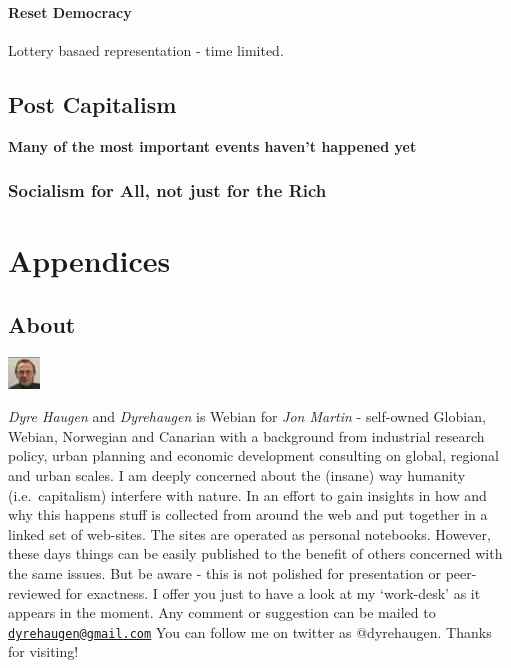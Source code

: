 \documentclass[
]{book}
\begin{document}
\hypertarget{reset-democracy}{%
\subsection{Reset Democracy}\label{reset-democracy}}

Lottery basaed representation - time limited.

\hypertarget{post-capitalism}{%
\chapter{Post Capitalism}\label{post-capitalism}}

\textbf{Many of the most important events haven't happened yet}

\hypertarget{socialism-for-all-not-just-for-the-rich}{%
\section{Socialism for All, not just for the Rich}\label{socialism-for-all-not-just-for-the-rich}}

\hypertarget{part-appendices}{%
\part{Appendices}\label{part-appendices}}

\hypertarget{appendix-appendices}{%
\appendix}


\hypertarget{about}{%
\chapter{About}\label{about}}

\includegraphics{fig/me.jpg}

\emph{Dyre Haugen} and \emph{Dyrehaugen} is Webian for \emph{Jon Martin} -
self-owned Globian, Webian, Norwegian and Canarian with
a background from industrial research policy, urban planning and
economic development consulting on global, regional and urban scales.
I am deeply concerned about the (insane) way
humanity (i.e.~capitalism) interfere with nature.
In an effort to gain insights in how and why this happens
stuff is collected from around the web and put together
in a linked set of web-sites.
The sites are operated as personal notebooks.
However, these days things can be easily published to the
benefit of others concerned with the same issues.
But be aware - this is not polished for presentation or
peer-reviewed for exactness.
I offer you just to have a look at my `work-desk' as it appears in the moment.
Any comment or suggestion can be mailed to \href{mailto:dyrehaugen@gmail.com}{\nolinkurl{dyrehaugen@gmail.com}}
You can follow me on twitter as @dyrehaugen.
Thanks for visiting!
\end{document}
